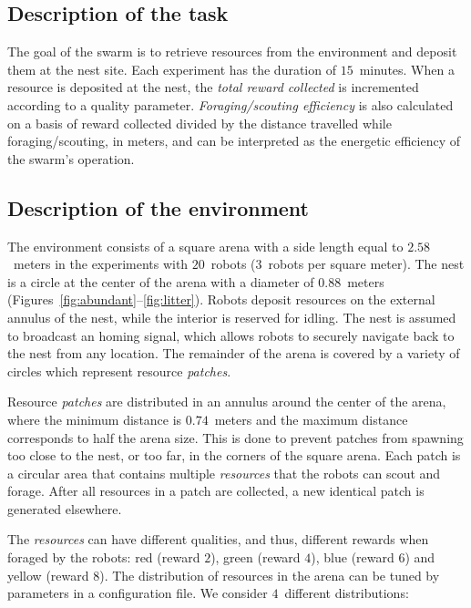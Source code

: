 \documentclass[runningheads]{llncs}
\begin{document}
\subsection{Description of the task} 
The goal of the swarm is to retrieve resources from the environment and deposit them at the nest site. Each experiment has the duration of $15$~minutes. When a resource is deposited at the nest, the \emph{total reward collected} is incremented according to a quality parameter. \emph{Foraging/scouting efficiency} is also calculated on a basis of reward collected divided by the distance travelled while foraging/scouting, in meters, and can be interpreted as the energetic efficiency of the swarm's operation.

\subsection{Description of the environment}
\label{subsec:env}

The environment consists of a square arena with a side length equal to $2.58$~meters in the experiments with $20$~robots ($3$~robots per square meter). The nest is a circle at the center of the arena with a diameter of $0.88$~meters (Figures~\ref{fig:abundant}--\ref{fig:litter}). Robots deposit resources on the external annulus of the nest, while the interior is reserved for idling. The nest is assumed to broadcast an homing signal, which allows robots to securely navigate back to the nest from any location. The remainder of the arena is covered by a variety of circles which represent resource \emph{patches}.

Resource \emph{patches} are distributed in an annulus around the center of the arena, where the minimum distance is $0.74$~meters and the maximum distance corresponds to half the arena size. This is done to prevent patches from spawning too close to the nest, or too far, in the corners of the square arena. Each patch is a circular area that contains multiple \emph{resources} that the robots can scout and forage. After all resources in a patch are collected, a new identical patch is generated elsewhere.

The \emph{resources} can have different qualities, and thus, different rewards when foraged by the robots: red (reward $2$), green (reward $4$), blue (reward $6$) and yellow (reward $8$). 
The distribution of resources in the arena can be tuned by parameters in a configuration file. We consider $4$~different distributions:

\vspace{-4mm}
\end{document}
